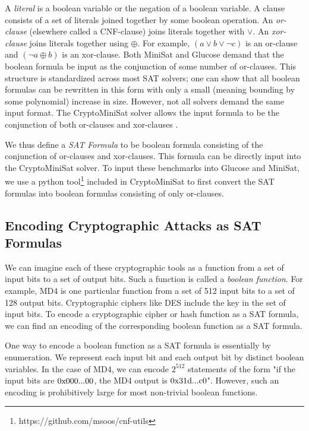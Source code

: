 A \emph{literal} is a boolean variable or the negation of a boolean variable. A clause consists of a set of literals joined together by some boolean operation. An \emph{or-clause} (elsewhere called a CNF-clause) joins literals together with $\lor$. An \emph{xor-clause} joins literals together using $\oplus$. For example, $(a \lor b \lor \neg c)$ is an or-clause and $(\neg a \oplus b)$ is an xor-clause. Both MiniSat and Glucose demand that the boolean formula be input as the conjunction of some number of or-clauses. This structure is standardized across most SAT solvers; one can show that all boolean formulas can be rewritten in this form with only a small (meaning bounding by some polynomial) increase in size. However, not all solvers demand the same input format. The CryptoMiniSat \cite{SNC09} solver allows the input formula to be the conjunction of both or-clauses and xor-clauses . 

We thus define a \emph{SAT Formula} to be boolean formula consisting of the conjunction of or-clauses and xor-clauses. This formula can be directly input into the CryptoMiniSat solver. To input these benchmarks into Glucose and MiniSat, we use a python tool\footnote{https://github.com/msoos/cnf-utils} included in CryptoMiniSat to first convert the SAT formulas into boolean formulas consisting of only or-clauses.


\subsection{Encoding Cryptographic Attacks as SAT Formulas}
\label{sec:encoding:desc}
We can imagine each of these cryptographic tools as a function from a set of input bits to a set of output 
bits. Such a function is called a \emph{boolean function}. For example, MD4 is one particular function from a set of 512 input bits to a set of 128 output bits. Cryptographic ciphers like DES include the key in the set of input bits. To encode a cryptographic cipher or hash function as a SAT formula, we can find an encoding of the corresponding boolean function as a SAT formula.

One way to encode a boolean function as a SAT formula is essentially by enumeration. We represent each input bit and each output bit by distinct boolean variables. In the case of MD4, we can encode $2^{512}$ statements of the form "if the input bits are $0\text{x000...00}$, the MD4 output is $0\text{x31d...c0}$". However, such an encoding is prohibitively large for most non-trivial boolean functions.

